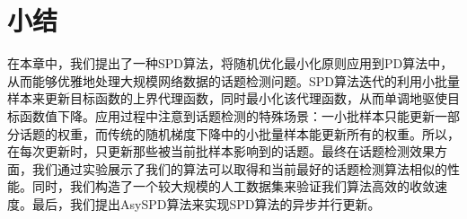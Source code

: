 \section{小结}

在本章中，我们提出了一种SPD算法，将随机优化最小化原则应用到PD算法中，从而能够优雅地处理大规模网络数据的话题检测问题。SPD算法迭代的利用小批量样本来更新目标函数的上界代理函数，同时最小化该代理函数，从而单调地驱使目标函数值下降。应用过程中注意到话题检测的特殊场景：一小批样本只能更新一部分话题的权重，而传统的随机梯度下降中的小批量样本能更新所有的权重。所以，在每次更新时，只更新那些被当前批样本影响到的话题。最终在话题检测效果方面，我们通过实验展示了我们的算法可以取得和当前最好的话题检测算法相似的性能。同时，我们构造了一个较大规模的人工数据集来验证我们算法高效的收敛速度。最后，我们提出AsySPD算法来实现SPD算法的异步并行更新。